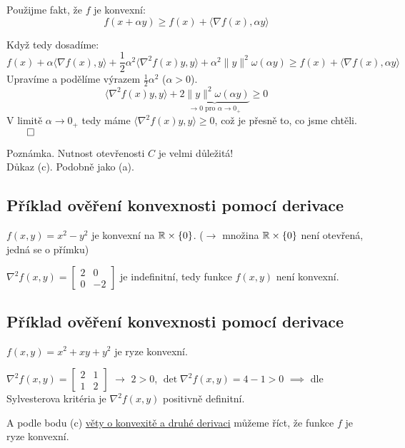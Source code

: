 Použijme fakt, že $f$ je konvexní:
\[
    f(x+\alpha y) \geq f(x) + \langle \nabla f(x), \alpha y\rangle
\]

Když tedy dosadíme:
\[
    f(x) + \alpha \langle \nabla f(x), y\rangle + \frac{1}{2}\alpha^2 \langle \nabla^2 f(x)y, y\rangle
    + \alpha^2 \| y\|^2 \omega(\alpha y) \geq f(x) + \langle \nabla f(x), \alpha y\rangle
\]
Upravíme a podělíme výrazem $\frac{1}{2}\alpha^2$ ($\alpha > 0$).
\[
   \langle \nabla^2 f(x)y, y\rangle + \underbrace{2 \| y\|^2 \omega(\alpha y)}_{\rightarrow 0 \text{ pro } 
   \alpha \rightarrow 0_+} \geq 0
\]
V limitě $\alpha \rightarrow 0_+$ tedy máme $\langle \nabla^2 f(x)y, y\rangle \geq 0$, což je přesně to, co jsme chtěli.
$\qed$

Poznámka. Nutnost otevřenosti $C$ je velmi důležitá!
\\

Důkaz (c). Podobně jako (a).

\subsection{Příklad ověření konvexnosti pomocí derivace}
$f(x, y) = x^2 - y^2$ je konvexní na $\mathbb{R} \times \left\lbrace 0 \right\rbrace$. ($\rightarrow$ množina $\mathbb{R} \times \left\lbrace 0 \right\rbrace$ není 
otevřená, jedná se o přímku)

$\nabla^2 f(x, y) = 
\begin{bmatrix}
    2 & 0 \\
    0 & -2
\end{bmatrix}$ je indefinitní, tedy funkce $f(x, y)$ není konvexní.

\subsection{Příklad ověření konvexnosti pomocí derivace}
$f(x, y) = x^2 + xy + y^2$ je ryze konvexní.

$\nabla^2 f(x, y) = 
\begin{bmatrix}
    2 & 1 \\
    1 & 2
\end{bmatrix}$ $\rightarrow$ $2>0$, $\det \nabla^2 f(x,y) = 4-1>0$ $\implies$ dle Sylvesterova kritéria je 
$\nabla^2 f(x,y)$ positivně definitní.

A podle bodu (c) \hyperref[konvDDeriv]{věty o konvexitě a druhé derivaci} můžeme říct, že funkce $f$ je ryze konvexní.
